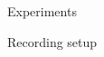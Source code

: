\documentclass[final]{beamer}
\newlength{\onecolwid}
\newlength{\twocolwid}
\begin{document}
\begin{frame}[t]
\begin{columns}[t]
\begin{column}{\onecolwid}
\begin{block}{Experiments}

\end{block}












\begin{block}{Recording setup}






\end{block}
\end{column}
\end{columns}
\end{frame}
\end{document}
